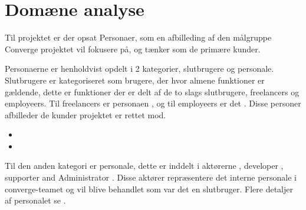 \section{Domæne analyse}

Til projektet er der opsat Personaer, som en afbilleding af den målgruppe Converge projektet vil fokusere på, og tænker som de primære kunder. 

Personaerne er henholdvist opdelt i 2 kategorier, slutbrugere og personale. Slutbrugere er kategoriseret som brugere, der hvor almene funktioner er gældende, dette er funktioner der er delt af de to slags slutbrugere, freelancers og employeers. Til freelancers er personaen , og til employeers er det . Disse personer afbilleder de kunder projektet er rettet mod.

\begin{itemize}
    \item {}
    \item {}
\end{itemize}

Til den anden kategori er personale, dette er inddelt i aktørerne , developer , supporter  and Administrator . Disse aktører repræsentere det interne personale i converge-teamet og vil blive behandlet som var det en slutbruger. Flere detaljer af personalet se .